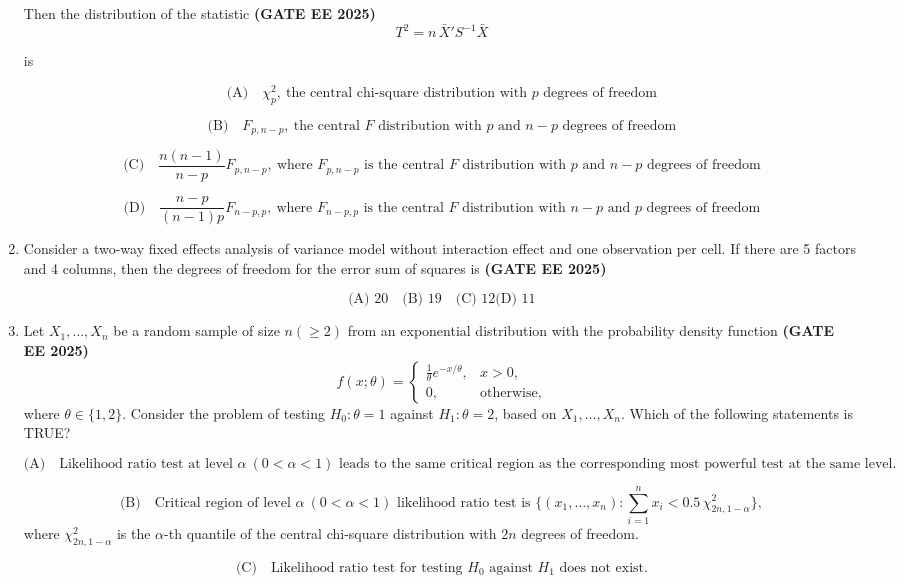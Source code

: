 \documentclass[journal,12pt,onecolumn]{IEEEtran}
\theoremstyle{remark}
\begin{document}
\begin{enumerate}
Then the distribution of the statistic \hfill \textbf{(GATE EE 2025)}
\[
T^2 = n \, \bar{X}' S^{-1} \bar{X}
\]

is

\[
\text{(A)} \quad \chi_p^2, \ \text{the central chi-square distribution with $p$ degrees of freedom}
\]

\[
\text{(B)} \quad F_{p,n-p}, \ \text{the central $F$ distribution with $p$ and $n-p$ degrees of freedom}
\]

\[
\text{(C)} \quad \frac{n(n-1)}{n-p} F_{p,n-p}, \ \text{where $F_{p,n-p}$ is the central $F$ distribution with $p$ and $n-p$ degrees of freedom}
\]

\[
\text{(D)} \quad \frac{n-p}{(n-1)p} F_{n-p,p}, \ \text{where $F_{n-p,p}$ is the central $F$ distribution with $n-p$ and $p$ degrees of freedom}
\]


\item Consider a two-way fixed effects analysis of variance model without interaction effect and one observation per cell. If there are 5 factors and 4 columns, then the degrees of freedom for the error sum of squares is \hfill \textbf{(GATE EE 2025)}

\[
\text{(A) } 20 \quad \text{(B) } 19  \quad\text{(C) } 12 \text {(D) } 11
\]

\item Let $X_1, \ldots, X_n$ be a random sample of size $n (\geq 2)$ from an exponential distribution with the probability density function \hfill \textbf{(GATE EE 2025)}
\[
f(x;\theta) = 
\begin{cases}
\frac{1}{\theta} e^{-x/\theta}, & x > 0, \\
0, & \text{otherwise,}
\end{cases}
\]
where $\theta \in \{1,2\}$. Consider the problem of testing $H_0: \theta=1$ against $H_1: \theta=2$, based on $X_1, \ldots, X_n$. Which of the following statements is TRUE? 

\[
\text{(A)} \quad \text{Likelihood ratio test at level $\alpha \ (0 < \alpha < 1)$ leads to the same critical region as the corresponding most powerful test at the same level.}
\]

\[
\text{(B)} \quad \text{Critical region of level $\alpha \ (0 < \alpha < 1)$ likelihood ratio test is } 
\{(x_1,\ldots,x_n): \sum_{i=1}^n x_i < 0.5 \, \chi^2_{2n,1-\alpha}\},
\]
where $\chi^2_{2n,1-\alpha}$ is the $\alpha$-th quantile of the central chi-square distribution with $2n$ degrees of freedom.


\[
\text{(C)} \quad \text{Likelihood ratio test for testing $H_0$ against $H_1$ does not exist.}
\]


\end{enumerate}
\end{document}
